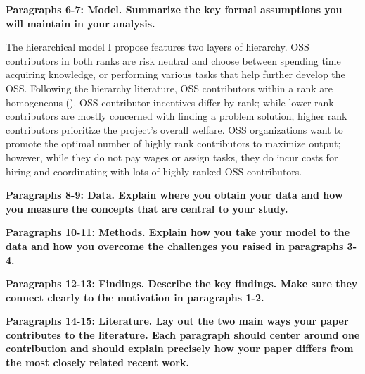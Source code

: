 \documentclass[12pt,notitlepage]{article}
\begin{document}
\textbf{Paragraphs 6-7: Model. Summarize the key formal assumptions you will maintain in your analysis.}

\qquad The hierarchical model I propose features two layers of hierarchy. OSS contributors in both ranks are risk neutral and choose between spending time acquiring knowledge, or performing various tasks that help further develop the OSS. Following the hierarchy literature, OSS contributors within a rank are homogeneous (\cite{garicano_hierarchies_2000}). OSS contributor incentives differ by rank; while lower rank contributors are mostly concerned with finding a problem solution, higher rank contributors prioritize the project's overall welfare. OSS organizations want to promote the optimal number of highly rank contributors to maximize output; however, while they do not pay wages or assign tasks, they do incur costs for hiring and coordinating with lots of highly ranked OSS contributors. 

\textbf{Paragraphs 8-9: Data. Explain where you obtain your data and how you measure the concepts that are central to your study.}

\textbf{Paragraphs 10-11: Methods. Explain how you take your model to the data and how you overcome the challenges you raised in paragraphs 3-4.}

\textbf{Paragraphs 12-13: Findings. Describe the key findings. Make sure they connect clearly to the motivation in paragraphs 1-2.}

\textbf{Paragraphs 14-15: Literature. Lay out the two main ways your paper contributes to the literature. Each paragraph should center around one contribution and should explain precisely how your paper differs from the most closely related recent work.}
\end{document}
